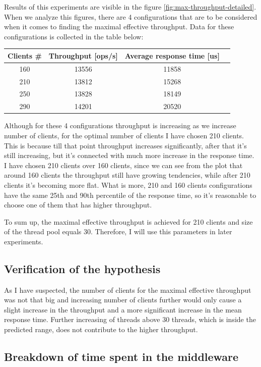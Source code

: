 \documentclass[11pt]{article}
\begin{document}
Results of this experiments are visible in the figure \ref{fig:max-throughput-detailed}. When we analyze this figures, there are 4 configurations that are to be considered when it comes to finding the maximal effective throughput. Data for these configurations is collected in the table below:

\medskip

\begin{tabular}{|c|c|c|c|}
\hline \bf{Clients \#} & Throughput [ops/s] &\bf{Average response time [us]}  \\
\hline 160 & 13556 & 11858 \\
\hline 210 & 13812 & 15268 \\
\hline 250 & 13828 & 18149 \\
\hline 290 & 14201 & 20520 \\
\hline
\end{tabular}
\medskip

Although for these 4 configurations throughput is increasing as we increase number of clients, for the optimal number of clients I have chosen 210 clients. This is because till that point throughput increases significantly, after that it's still increasing, but it's connected with much more increase in the response time. I have chosen 210 clients over 160 clients, since we can see from the plot that around 160 clients the throughput still have growing tendencies, while after 210 clients it's becoming more flat. What is more, 210 and 160 clients configurations have the same 25th and 90th percentile of the response time, so it's reasonable to choose one of them that has higher throughput.

To sum up, the maximal effective throughput is achieved for 210 clients and size of the thread pool equals 30. Therefore, I will use this parameters in later experiments.  

\subsection{Verification of the hypothesis}

As I have suspected, the number of clients for the maximal effective throughput was not that big and increasing number of clients further would only cause a slight increase in the throughput and a more significant increase in the mean response time. Further increasing of threads above 30 threads, which is inside the predicted range, does not contribute to the higher throughput.

\subsection{Breakdown of time spent in the middleware}
\label{sec:time-breakdown}
\end{document}
